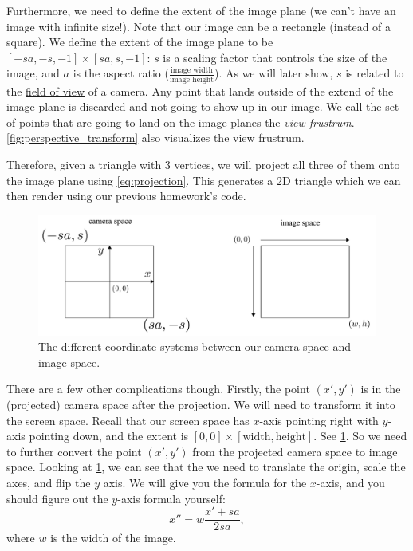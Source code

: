 Furthermore, we need to define the extent of the image plane (we can't have an image with infinite size!). Note that our image can be a rectangle (instead of a square). We define the extent of the image plane to be $[-sa, -s, -1] \times [sa, s, -1]$: $s$ is a scaling factor that controls the size of the image, and $a$ is the aspect ratio ($\frac{\text{image width}}{\text{image height}}$). As we will later show, $s$ is related to the \href{https://en.wikipedia.org/wiki/Field_of_view}{field of view} of a camera. Any point that lands outside of the extend of the image plane is discarded and not going to show up in our image. We call the set of points that are going to land on the image planes the \emph{view frustrum}. \cref{fig:perspective_transform} also visualizes the view frustrum.

Therefore, given a triangle with 3 vertices, we will project all three of them onto the image plane using \cref{eq:projection}. This generates a 2D triangle which we can then render using our previous homework's code.

\begin{figure}[h]
    \centering
    \includegraphics[width=0.9\linewidth]{imgs/camera_vs_image.pdf}
    \caption{The different coordinate systems between our camera space and image space.}
    \label{fig:camera_vs_image}
\end{figure}

There are a few other complications though. Firstly, the point $(x', y')$ is in the (projected) camera space after the projection. We will need to transform it into the screen space. Recall that our screen space has $x$-axis pointing right with $y$-axis pointing down, and the extent is $[0, 0] \times [\text{width}, \text{height}]$. See \cref{fig:camera_vs_image}. So we need to further convert the point $(x', y')$ from the projected camera space to image space. Looking at \cref{fig:camera_vs_image}, we can see that the we need to translate the origin, scale the axes, and flip the $y$ axis. We will give you the formula for the $x$-axis, and you should figure out the $y$-axis formula yourself:
\begin{equation}
x'' = w\frac{x'+sa}{2sa},
\label{eq:camera_to_screen}
\end{equation}
where $w$ is the width of the image.


